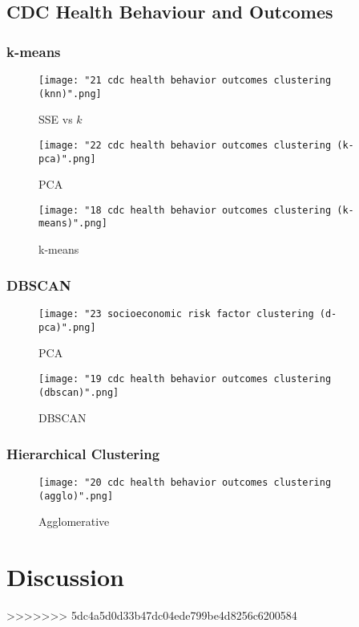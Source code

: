 \documentclass{article}
\begin{document}
		\subsection{CDC Health Behaviour and Outcomes}
			\subsubsection{k-means}
				\begin{figure}[h]
					\centering
					\caption{SSE vs $k$}
					\texttt{[image: "21 cdc health behavior outcomes clustering (knn)".png]}
					\label{fig:combinedKnn}
				\end{figure}
				\begin{figure}[h]
					\centering
					\caption{PCA}
					\texttt{[image: "22 cdc health behavior outcomes clustering (k-pca)".png]}
					\label{fig:combinedKpca}
				\end{figure}
				\begin{figure}[h]
					\centering
					\caption{k-means}
					\texttt{[image: "18 cdc health behavior outcomes clustering (k-means)".png]}
					\label{fig:combinedKmeans}
				\end{figure}
			\subsubsection{DBSCAN}
				\begin{figure}[h]
					\centering
					\caption{PCA}
					\texttt{[image: "23 socioeconomic risk factor clustering (d-pca)".png]}
					\label{fig:combinedDpca}
				\end{figure}
				\begin{figure}[h]
					\centering
					\caption{DBSCAN}
					\texttt{[image: "19 cdc health behavior outcomes clustering (dbscan)".png]}
					\label{fig:combinedDbscan}
				\end{figure}
			\subsubsection{Hierarchical Clustering}
				\begin{figure}[h]
					\centering
					\caption{Agglomerative}
					\texttt{[image: "20 cdc health behavior outcomes clustering (agglo)".png]}
					\label{fig:combinedAgglo}
				\end{figure}
	\section{Discussion}
	
	
>>>>>>> 5dc4a5d0d33b47dc04ede799be4d8256c6200584
\end{document}
